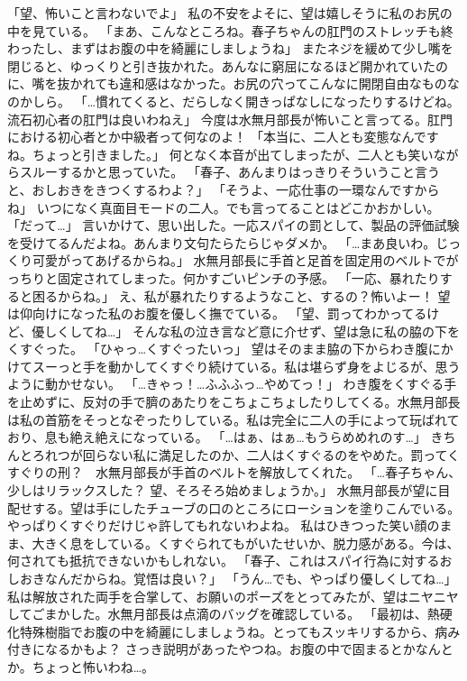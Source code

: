「望、怖いこと言わないでよ」
私の不安をよそに、望は嬉しそうに私のお尻の中を見ている。
「まあ、こんなところね。春子ちゃんの肛門のストレッチも終わったし、まずはお腹の中を綺麗にしましょうね」
またネジを緩めて少し嘴を閉じると、ゆっくりと引き抜かれた。あんなに窮屈になるほど開かれていたのに、嘴を抜かれても違和感はなかった。お尻の穴ってこんなに開閉自由なものなのかしら。
「…慣れてくると、だらしなく開きっぱなしになったりするけどね。流石初心者の肛門は良いわねえ」
今度は水無月部長が怖いこと言ってる。肛門における初心者とか中級者って何なのよ！
「本当に、二人とも変態なんですね。ちょっと引きました。」
何となく本音が出てしまったが、二人とも笑いながらスルーするかと思っていた。
「春子、あんまりはっきりそういうこと言うと、おしおきをきつくするわよ？」
「そうよ、一応仕事の一環なんですからね」
いつになく真面目モードの二人。でも言ってることはどこかおかしい。
「だって…」
言いかけて、思い出した。一応スパイの罰として、製品の評価試験を受けてるんだよね。あんまり文句たらたらじゃダメか。
「…まあ良いわ。じっくり可愛がってあげるからね。」
水無月部長に手首と足首を固定用のベルトでがっちりと固定されてしまった。何かすごいピンチの予感。
「一応、暴れたりすると困るからね。」
え、私が暴れたりするようなこと、するの？怖いよー！
望は仰向けになった私のお腹を優しく撫でている。
「望、罰ってわかってるけど、優しくしてね…」
そんな私の泣き言など意に介せず、望は急に私の脇の下をくすぐった。
「ひゃっ…くすぐったいっ」
望はそのまま脇の下からわき腹にかけてスーっと手を動かしてくすぐり続けている。私は堪らず身をよじるが、思うように動かせない。
「…きゃっ！…ふふふっ…やめてっ！」
わき腹をくすぐる手を止めずに、反対の手で臍のあたりをこちょこちょしたりしてくる。水無月部長は私の首筋をそっとなぞったりしている。私は完全に二人の手によって玩ばれており、息も絶え絶えになっている。
「…はぁ、はぁ…もうらめめれのす…」
きちんとろれつが回らない私に満足したのか、二人はくすぐるのをやめた。罰ってくすぐりの刑？　水無月部長が手首のベルトを解放してくれた。
「…春子ちゃん、少しはリラックスした？ 望、そろそろ始めましょうか。」
水無月部長が望に目配せする。望は手にしたチューブの口のところにローションを塗りこんでいる。やっぱりくすぐりだけじゃ許してもれないわよね。
私はひきつった笑い顔のまま、大きく息をしている。くすぐられてもがいたせいか、脱力感がある。今は、何されても抵抗できないかもしれない。
「春子、これはスパイ行為に対するおしおきなんだからね。覚悟は良い？」
「うん…でも、やっぱり優しくしてね…」
私は解放された両手を合掌して、お願いのポーズをとってみたが、望はニヤニヤしてごまかした。水無月部長は点滴のバッグを確認している。
「最初は、熱硬化特殊樹脂でお腹の中を綺麗にしましょうね。とってもスッキリするから、病み付きになるかもよ？
さっき説明があったやつね。お腹の中で固まるとかなんとか。ちょっと怖いわね…。
